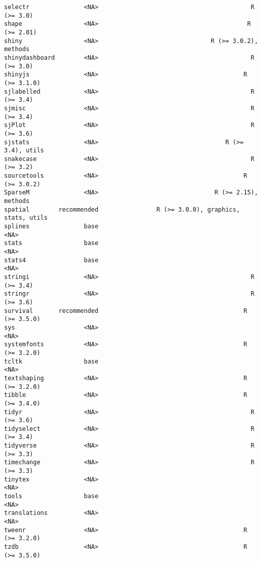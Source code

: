 \documentclass[
  letterpaper,
  DIV=11,
  numbers=noendperiod]{scrreprt}
\begin{document}
\begin{verbatim}
selectr               <NA>                                          R (>= 3.0)
shape                 <NA>                                         R (>= 2.01)
shiny                 <NA>                               R (>= 3.0.2), methods
shinydashboard        <NA>                                          R (>= 3.0)
shinyjs               <NA>                                        R (>= 3.1.0)
sjlabelled            <NA>                                          R (>= 3.4)
sjmisc                <NA>                                          R (>= 3.4)
sjPlot                <NA>                                          R (>= 3.6)
sjstats               <NA>                                   R (>= 3.4), utils
snakecase             <NA>                                          R (>= 3.2)
sourcetools           <NA>                                        R (>= 3.0.2)
SparseM               <NA>                                R (>= 2.15), methods
spatial        recommended                R (>= 3.0.0), graphics, stats, utils
splines               base                                                <NA>
stats                 base                                                <NA>
stats4                base                                                <NA>
stringi               <NA>                                          R (>= 3.4)
stringr               <NA>                                          R (>= 3.6)
survival       recommended                                        R (>= 3.5.0)
sys                   <NA>                                                <NA>
systemfonts           <NA>                                        R (>= 3.2.0)
tcltk                 base                                                <NA>
textshaping           <NA>                                        R (>= 3.2.0)
tibble                <NA>                                        R (>= 3.4.0)
tidyr                 <NA>                                          R (>= 3.6)
tidyselect            <NA>                                          R (>= 3.4)
tidyverse             <NA>                                          R (>= 3.3)
timechange            <NA>                                          R (>= 3.3)
tinytex               <NA>                                                <NA>
tools                 base                                                <NA>
translations          <NA>                                                <NA>
tweenr                <NA>                                        R (>= 3.2.0)
tzdb                  <NA>                                        R (>= 3.5.0)

\end{verbatim}
\end{document}
